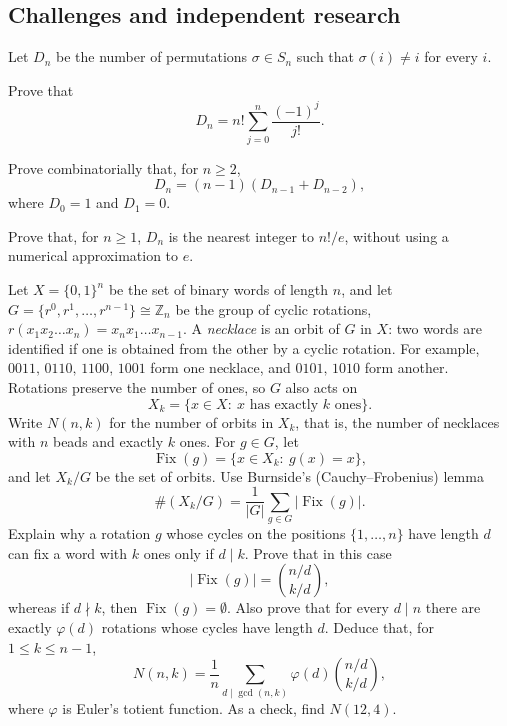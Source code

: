 \subsection*{Challenges and independent research}
\begin{problemstar}[Derangements]
Let $D_n$ be the number of permutations $\sigma\in S_n$ such that $\sigma(i)\ne i$ for every $i$.
\begin{enumeratea}
  \item Prove that
  \[ D_n=n!\sum_{j=0}^{n}\frac{(-1)^j}{j!}. \]
  \item Prove combinatorially that, for $n\ge 2$,
  \[ D_n=(n-1)(D_{n-1}+D_{n-2}), \]
  where $D_0=1$ and $D_1=0$.
  \item Prove that, for $n\ge 1$, $D_n$ is the nearest integer to $n!/e$,
  without using a numerical approximation to $e$.
\end{enumeratea}
\end{problemstar}
\begin{problemstar}
Let $X=\{0,1\}^n$ be the set of binary words of length $n$, and let
$G=\{r^0,r^1,\dots,r^{n-1}\}\cong\mathbb Z_n$ be the group of cyclic rotations,
$r(x_1x_2\dots x_n)=x_nx_1\dots x_{n-1}$. A \emph{necklace} is an orbit of $G$
in $X$: two words are identified if one is obtained from the other by a cyclic
rotation. For example, $0011,\,0110,\,1100,\,1001$ form one necklace, and
$0101,\,1010$ form another. Rotations preserve the number of ones, so $G$ also acts on
\[ X_k=\{x\in X:\ x\text{ has exactly }k\text{ ones}\}. \]
Write $N(n,k)$ for the number of orbits in $X_k$, that is, the number of necklaces
with $n$ beads and exactly $k$ ones.
For $g\in G$, let
\[ \operatorname{Fix}(g)=\{x\in X_k:\ g(x)=x\}, \]
and let $X_k/G$ be the set of orbits. Use Burnside's (Cauchy--Frobenius) lemma
\[ \#(X_k/G)=\frac1{|G|}\sum_{g\in G}|\operatorname{Fix}(g)|. \]
Explain why a rotation $g$ whose cycles on the positions $\{1,\dots,n\}$ have
length $d$ can fix a word with $k$ ones only if $d\mid k$. Prove that in this case
\[ |\operatorname{Fix}(g)|=\binom{n/d}{k/d}, \]
whereas if $d\nmid k$, then $\operatorname{Fix}(g)=\emptyset$. Also prove that
for every $d\mid n$ there are exactly $\varphi(d)$ rotations whose cycles have length $d$.
Deduce that, for $1\le k\le n-1$,
\[ N(n,k)=\frac1n\sum_{d\mid\gcd(n,k)}\varphi(d)\binom{n/d}{k/d}, \]
where $\varphi$ is Euler's totient function. As a check, find $N(12,4)$.
\end{problemstar}
